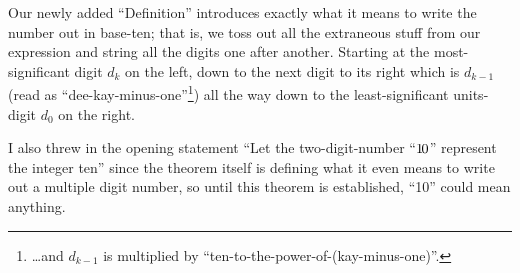\documentclass{article}
\newenvironment{jprIn}{\begin{adjustwidth}{2em}{}}{\end{adjustwidth}}
\begin{document}
% 
% 
% 

Our newly added ``Definition'' introduces exactly what it means to write
the number out in base-ten; that is,
we toss out all the extraneous stuff from our expression
and string all the digits one after another.
Starting at the most-significant digit $d_k$ on the left,
down to the next digit to its right which is $d_{k-1}$
(read as ``dee-kay-minus-one''\footnote{\dots{}and $d_{k-1}$ is
multiplied by ``ten-to-the-power-of-(kay-minus-one)''.})
all the way down to the least-significant units-digit $d_0$ on the right.

I also threw in the opening statement
``Let the two-digit-number ``${1\hspace{-0.12em}0}$'' represent the integer ten''
since the theorem itself is defining what it even means to write out
a multiple digit number, so until this theorem is established, ``10'' could
mean anything.

% 
% 
% 
\end{document}
